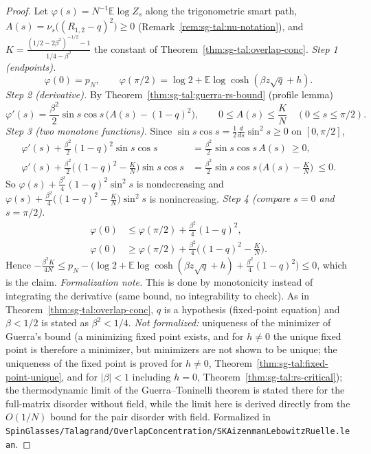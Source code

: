 \begin{proof}
\leanok
Let $\varphi(s)=N^{-1}\mathbb{E}\log Z_s$ along the trigonometric smart path, $A(s)=\nu_s\big((R_{1,2}-q)^2\big)\ge0$ (Remark~\ref{rem:sg-tal:nu-notation}), and $K=\frac{(1/2-2\beta^2)^{-1/2}-1}{1/4-\beta^2}$ the constant of Theorem~\ref{thm:sg-tal:overlap-conc}.
\emph{Step 1 (endpoints).}
\[
\varphi(0)=p_N,\qquad \varphi(\pi/2)=\log2+\mathbb{E}\log\cosh(\beta z\sqrt q+h).
\]
\emph{Step 2 (derivative).} By Theorem~\ref{thm:sg-tal:guerra-rs-bound} (profile lemma)
\[
\varphi'(s)=\frac{\beta^2}2\sin s\cos s\,\big(A(s)-(1-q)^2\big),\qquad 0\le A(s)\le \frac{K}N\quad(0\le s\le\pi/2).
\]
\emph{Step 3 (two monotone functions).} Since $\sin s\cos s=\frac12\frac d{ds}\sin^2s\ge0$ on $[0,\pi/2]$,
\begin{align*}
\varphi'(s)+\tfrac{\beta^2}2(1-q)^2\sin s\cos s&=\tfrac{\beta^2}2\sin s\cos s\,A(s)\ \ge0,\\
\varphi'(s)+\tfrac{\beta^2}2\big((1-q)^2-\tfrac{K}N\big)\sin s\cos s&=\tfrac{\beta^2}2\sin s\cos s\,\big(A(s)-\tfrac{K}N\big)\ \le0 .
\end{align*}
So $\varphi(s)+\frac{\beta^2}4(1-q)^2\sin^2s$ is nondecreasing and $\varphi(s)+\frac{\beta^2}4\big((1-q)^2-\frac{K}N\big)\sin^2s$ is nonincreasing.
\emph{Step 4 (compare $s=0$ and $s=\pi/2$).}
\begin{align*}
\varphi(0)&\le\varphi(\pi/2)+\tfrac{\beta^2}4(1-q)^2,\\
\varphi(0)&\ge\varphi(\pi/2)+\tfrac{\beta^2}4\big((1-q)^2-\tfrac{K}N\big).
\end{align*}
Hence $-\frac{\beta^2K}{4N}\le p_N-\big(\log2+\mathbb{E}\log\cosh(\beta z\sqrt q+h)+\frac{\beta^2}4(1-q)^2\big)\le0$, which is the claim.
\emph{Formalization note.} This is done by monotonicity instead of integrating the derivative (same bound, no integrability to check).
As in Theorem~\ref{thm:sg-tal:overlap-conc}, $q$ is a hypothesis (fixed-point equation) and $\beta<1/2$ is stated as $\beta^2<1/4$.
\emph{Not formalized:} uniqueness of the minimizer of Guerra's bound (a minimizing fixed point exists, and for $h\ne0$ the unique fixed point is therefore a minimizer, but minimizers are not shown to be unique; the uniqueness of the fixed point is proved for $h\ne0$, Theorem~\ref{thm:sg-tal:fixed-point-unique}, and for $|\beta|<1$ including $h=0$, Theorem~\ref{thm:sg-tal:rs-critical}); the thermodynamic limit of the Guerra--Toninelli theorem is stated there for the full-matrix disorder without field, while the limit here is derived directly from the $O(1/N)$ bound for the pair disorder with field.
Formalized in \texttt{SpinGlasses/Talagrand/OverlapConcentration/SKAizenmanLebowitzRuelle.lean}.
\end{proof}

